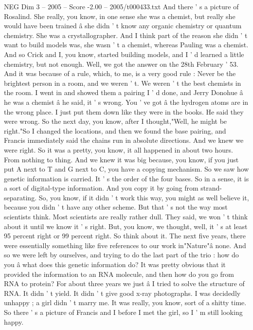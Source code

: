 \begin{textsample}{NEG Dim 3 – 2005 – Score -2.00 – 2005/t000433.txt}
And there ' s a picture of Rosalind.
She really, you know, in one sense she was a chemist, but really she would have been trained â she didn ' t know any organic chemistry or quantum chemistry.
She was a crystallographer.
And I think part of the reason she didn ' t want to build models was, she wasn ' t a chemist, whereas Pauling was a chemist.
And so Crick and I, you know, started building models, and I ' d learned a little chemistry, but not enough.
Well, we got the answer on the 28th February ' 53.
And it was because of a rule, which, to me, is a very good rule : Never be the brightest person in a room, and we weren ' t.
We weren ' t the best chemists in the room.
I went in and showed them a pairing I ' d done, and Jerry Donohue â he was a chemist â he said, it ' s wrong.
You ' ve got â the hydrogen atoms are in the wrong place.
I just put them down like they were in the books.
He said they were wrong.
So the next day, you know, after I thought,"Well, he might be right."So I changed the locations, and then we found the base pairing, and Francis immediately said the chains run in absolute directions.
And we knew we were right.
So it was a pretty, you know, it all happened in about two hours.
From nothing to thing.
And we knew it was big because, you know, if you just put A next to T and G next to C, you have a copying mechanism.
So we saw how genetic information is carried.
It ' s the order of the four bases.
So in a sense, it is a sort of digital-type information.
And you copy it by going from strand- separating.
So, you know, if it didn ' t work this way, you might as well believe it, because you didn ' t have any other scheme.
But that ' s not the way most scientists think.
Most scientists are really rather dull.
They said, we won ' t think about it until we know it ' s right.
But, you know, we thought, well, it ' s at least 95 percent right or 99 percent right.
So think about it.
The next five years, there were essentially something like five references to our work in"Nature"â none.
And so we were left by ourselves, and trying to do the last part of the trio : how do you â what does this genetic information do?
It was pretty obvious that it provided the information to an RNA molecule, and then how do you go from RNA to protein?
For about three years we just â I tried to solve the structure of RNA.
It didn ' t yield.
It didn ' t give good x-ray photographs.
I was decidedly unhappy ; a girl didn ' t marry me.
It was really, you know, sort of a shitty time.
So there ' s a picture of Francis and I before I met the girl, so I ' m still looking happy.

\end{textsample}
